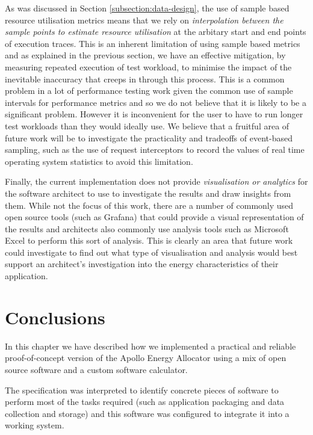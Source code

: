 As was discussed in Section \ref{subsection:data-design}, the use of sample based resource utilisation metrics means that we rely on \emph{interpolation between the sample points to estimate resource utilisation} at the arbitary start and end points of execution traces.  This is an inherent limitation of using sample based metrics and as explained in the previous section, we have an effective mitigation, by measuring repeated execution of test workload, to minimise the impact of the inevitable inaccuracy that creeps in through this process.  This is a common problem in a lot of performance testing work given the common use of sample intervals for performance metrics and so we do not believe that it is likely to be a significant problem. However it is inconvenient for the user to have to run longer test workloads than they would ideally use.  We believe that a fruitful area of future work will be to investigate the practicality and tradeoffs of event-based sampling, such as the use of request interceptors to record the values of real time operating system statistics to avoid this limitation.

Finally, the current implementation does not provide \emph{visualisation or analytics} for the software architect to use to investigate the results and draw insights from them.  While not the focus of this work, there are a number of commonly used open source tools (such as Grafana) that could provide a visual representation of the results and architects also commonly use analysis tools such as Microsoft Excel to perform this sort of analysis.  This is clearly an area that future work could investigate to find out what type of visualisation and analysis would best support an architect's investigation into the energy characteristics of their application.


\section{Conclusions}

In this chapter we have described how we implemented a practical and reliable proof-of-concept version of the Apollo Energy Allocator using a mix of open source software and a custom software calculator.

The specification was interpreted to identify concrete pieces of software to perform most of the tasks required (such as application packaging and data collection and storage) and this software was configured to integrate it into a working system.

